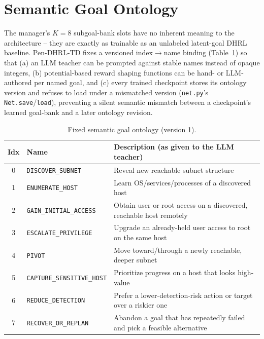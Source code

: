 \documentclass[11pt]{article}
\newcommand{\pendhrl}{Pen-DHRL-TD}
\newcommand{\code}[1]{\texttt{#1}}
\begin{document}
\section{Semantic Goal Ontology}
\label{sec:ontology}

The manager's $K{=}8$ subgoal-bank slots have no inherent meaning to the
architecture -- they are exactly as trainable as an unlabeled latent-goal DHRL
baseline. \pendhrl{} fixes a versioned index$\to$name binding
(Table~\ref{tab:ontology}) so that (a) an LLM teacher can be prompted against stable
names instead of opaque integers, (b) potential-based reward shaping functions can be
hand- or LLM-authored per named goal, and (c) every trained checkpoint stores its
ontology version and refuses to load under a mismatched version (\code{net.py}'s
\code{Net.save}/\code{load}), preventing a silent semantic mismatch between a
checkpoint's learned goal-bank and a later ontology revision.

\begin{table}[H]
\centering
\caption{Fixed semantic goal ontology (version 1).}
\label{tab:ontology}
\begin{tabular}{clp{7.5cm}}
\toprule
Idx & Name & Description (as given to the LLM teacher) \\
\midrule
0 & \code{DISCOVER\_SUBNET} & Reveal new reachable subnet structure \\
1 & \code{ENUMERATE\_HOST} & Learn OS/services/processes of a discovered host \\
2 & \code{GAIN\_INITIAL\_ACCESS} & Obtain user or root access on a discovered, reachable host remotely \\
3 & \code{ESCALATE\_PRIVILEGE} & Upgrade an already-held user access to root on the same host \\
4 & \code{PIVOT} & Move toward/through a newly reachable, deeper subnet \\
5 & \code{CAPTURE\_SENSITIVE\_HOST} & Prioritize progress on a host that looks high-value \\
6 & \code{REDUCE\_DETECTION} & Prefer a lower-detection-risk action or target over a riskier one \\
7 & \code{RECOVER\_OR\_REPLAN} & Abandon a goal that has repeatedly failed and pick a feasible alternative \\
\bottomrule
\end{tabular}
\end{table}
\end{document}
